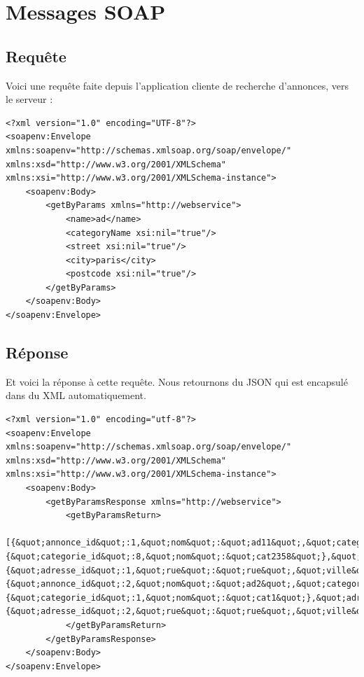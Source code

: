 \section{Messages SOAP}

\subsection{Requête}

Voici une requête faite depuis l'application cliente de recherche d'annonces, vers le serveur :

\xml
\begin{lstlisting}
<?xml version="1.0" encoding="UTF-8"?>
<soapenv:Envelope xmlns:soapenv="http://schemas.xmlsoap.org/soap/envelope/" xmlns:xsd="http://www.w3.org/2001/XMLSchema" xmlns:xsi="http://www.w3.org/2001/XMLSchema-instance">
	<soapenv:Body>
		<getByParams xmlns="http://webservice">
			<name>ad</name>
			<categoryName xsi:nil="true"/>
			<street xsi:nil="true"/>
			<city>paris</city>
			<postcode xsi:nil="true"/>
		</getByParams>
	</soapenv:Body>
</soapenv:Envelope>
\end{lstlisting}

\subsection{Réponse}

Et voici la réponse à cette requête. Nous retournons du JSON qui est encapsulé dans du XML automatiquement.

\begin{lstlisting}
<?xml version="1.0" encoding="utf-8"?>
<soapenv:Envelope xmlns:soapenv="http://schemas.xmlsoap.org/soap/envelope/" xmlns:xsd="http://www.w3.org/2001/XMLSchema" xmlns:xsi="http://www.w3.org/2001/XMLSchema-instance">
	<soapenv:Body>
		<getByParamsResponse xmlns="http://webservice">
			<getByParamsReturn>
                [{&quot;annonce_id&quot;:1,&quot;nom&quot;:&quot;ad11&quot;,&quot;categorie_id&quot;:8,&quot;adresse_id&quot;:1,&quot;telephone&quot;:&quot;0251&quot;,&quot;categorieObjet&quot;:{&quot;categorie_id&quot;:8,&quot;nom&quot;:&quot;cat2358&quot;},&quot;adresseObjet&quot;:{&quot;adresse_id&quot;:1,&quot;rue&quot;:&quot;rue&quot;,&quot;ville&quot;:&quot;paris&quot;,&quot;codepostal&quot;:&quot;85&quot;}},{&quot;annonce_id&quot;:2,&quot;nom&quot;:&quot;ad2&quot;,&quot;categorie_id&quot;:1,&quot;adresse_id&quot;:2,&quot;telephone&quot;:&quot;0251&quot;,&quot;categorieObjet&quot;:{&quot;categorie_id&quot;:1,&quot;nom&quot;:&quot;cat1&quot;},&quot;adresseObjet&quot;:{&quot;adresse_id&quot;:2,&quot;rue&quot;:&quot;rue&quot;,&quot;ville&quot;:&quot;parisss&quot;,&quot;codepostal&quot;:&quot;85&quot;}}]
			</getByParamsReturn>
		</getByParamsResponse>
	</soapenv:Body>
</soapenv:Envelope>
\end{lstlisting}

